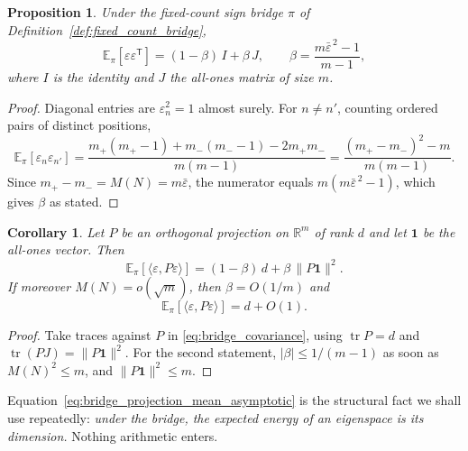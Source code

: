 \documentclass[11pt]{amsart}
\numberwithin{equation}{section}
\theoremstyle{plain}
\newtheorem{proposition}[theorem]{Proposition}
\newtheorem{corollary}[theorem]{Corollary}
\theoremstyle{definition}
\theoremstyle{remark}
\DeclareMathOperator{\tr}{tr}
\begin{document}
\begin{proposition}
\label{prop:bridge_covariance}
Under the fixed-count sign bridge $\pi$ of
Definition~\ref{def:fixed_count_bridge},
\begin{equation}
\mathbb{E}_\pi\!\left[\varepsilon \varepsilon^{\mathsf{T}}\right]
= (1-\beta)\, I + \beta\, J,
\qquad
\beta = \frac{m \bar{\varepsilon}^{\,2} - 1}{m-1},
\label{eq:bridge_covariance}
\end{equation}
where $I$ is the identity and $J$ the all-ones matrix of size $m$.
\end{proposition}

\begin{proof}
Diagonal entries are $\varepsilon_n^2 = 1$ almost surely. For
$n \neq n'$, counting ordered pairs of distinct positions,
\begin{equation}
\mathbb{E}_\pi[\varepsilon_n \varepsilon_{n'}]
= \frac{m_+(m_+-1) + m_-(m_--1) - 2 m_+ m_-}{m(m-1)}
= \frac{(m_+-m_-)^2 - m}{m(m-1)} .
\label{eq:offdiagonal_computation}
\end{equation}
Since $m_+ - m_- = M(N) = m\bar{\varepsilon}$, the numerator equals
$m(m\bar{\varepsilon}^{\,2} - 1)$, which gives $\beta$ as stated.
\end{proof}

\begin{corollary}
\label{cor:bridge_projection_mean}
Let $P$ be an orthogonal projection on $\mathbb{R}^m$ of rank $d$ and
let $\mathbf{1}$ be the all-ones vector. Then
\begin{equation}
\mathbb{E}_\pi\!\left[\langle \varepsilon, P \varepsilon\rangle\right]
= (1-\beta)\, d + \beta\, \|P\mathbf{1}\|^2 .
\label{eq:bridge_projection_mean}
\end{equation}
If moreover $M(N) = o(\sqrt{m})$, then $\beta = O(1/m)$ and
\begin{equation}
\mathbb{E}_\pi\!\left[\langle \varepsilon, P \varepsilon\rangle\right]
= d + O(1).
\label{eq:bridge_projection_mean_asymptotic}
\end{equation}
\end{corollary}

\begin{proof}
Take traces against $P$ in \eqref{eq:bridge_covariance}, using
$\tr P = d$ and $\tr(PJ) = \|P\mathbf{1}\|^2$. For the second
statement, $|\beta| \le 1/(m-1)$ as soon as
$M(N)^2 \le m$, and $\|P\mathbf{1}\|^2 \le m$.
\end{proof}

Equation~\eqref{eq:bridge_projection_mean_asymptotic} is the structural
fact we shall use repeatedly: \emph{under the bridge, the expected
energy of an eigenspace is its dimension.} Nothing arithmetic enters.
\end{document}
